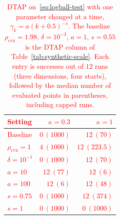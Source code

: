 \documentclass[]{interact}
\theoremstyle{plain}
\theoremstyle{definition}
\theoremstyle{remark}
\newcommand{\cvx}{\mathrm{cvx}}
\begin{document}
\begin{table}[t]
\centering\small
\setlength{\tabcolsep}{5pt}
\caption{\textcolor{red}{DTAP on~\eqref{eq:logball-test} with one parameter changed at a time,
$\gamma_k=a(k+0.5)^{-s}$. The baseline $\rho_{\cvx}=1.98$, $\delta=10^{-3}$, $a=1$,
$s=0.55$ is the DTAP column of Table~\ref{tab:synthetic-scale}. Each entry is
successes out of $12$ runs (three dimensions, four starts), followed by the
median number of evaluated points in parentheses, including capped runs.}}
\label{tab:dtap-sweep}
\begin{tabular}{@{}lrr@{}}
\toprule
\leavevmode\textcolor{red}{Setting} & \leavevmode\textcolor{red}{$\kappa=0.3$} & \leavevmode\textcolor{red}{$\kappa=1$}\\
\midrule
\leavevmode\textcolor{red}{Baseline} & \leavevmode\textcolor{red}{$0\ (1000)$} & \leavevmode\textcolor{red}{$12\ (70)$}\\
\leavevmode\textcolor{red}{$\rho_{\cvx}=1$} & \leavevmode\textcolor{red}{$4\ (1000)$} & \leavevmode\textcolor{red}{$12\ (223.5)$}\\
\leavevmode\textcolor{red}{$\delta=10^{-1}$} & \leavevmode\textcolor{red}{$0\ (1000)$} & \leavevmode\textcolor{red}{$12\ (70)$}\\
\leavevmode\textcolor{red}{$a=10$} & \leavevmode\textcolor{red}{$12\ (77)$} & \leavevmode\textcolor{red}{$12\ (6)$}\\
\leavevmode\textcolor{red}{$a=100$} & \leavevmode\textcolor{red}{$12\ (6)$} & \leavevmode\textcolor{red}{$12\ (48)$}\\
\leavevmode\textcolor{red}{$s=0.75$} & \leavevmode\textcolor{red}{$0\ (1000)$} & \leavevmode\textcolor{red}{$12\ (374)$}\\
\leavevmode\textcolor{red}{$s=1$} & \leavevmode\textcolor{red}{$0\ (1000)$} & \leavevmode\textcolor{red}{$0\ (1000)$}\\
\bottomrule
\end{tabular}
\end{table}
\end{document}
